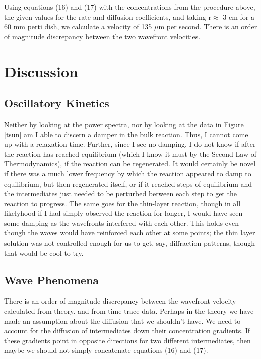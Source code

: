 \documentclass{article}
\begin{document}
Using equations (16) and (17) with the concentrations from the procedure above, the 
given values for the rate and diffusion coefficients, and taking $\mathrm{r}\approx$ 3 cm
for a 60 mm perti dish, we calculate a velocity of 135 $\mu$m per second. There is an 
order of magnitude discrepancy between the two wavefront velocities.

\section{Discussion}

\subsection{Oscillatory Kinetics}

Neither by looking at the power spectra, nor by looking at the data in Figure \ref{tsun} am
I able to discern a damper in the bulk reaction. Thus, I cannot come up with a relaxation 
time. Further, since I see no damping, I do not know if after the reaction has reached 
equilibrium (which I know it must by the Second Law of Thermodynamics), if the reaction can 
be  regenerated. It would certainly be novel if there was a much lower frequency by which the
reaction appeared to damp to equilibrium, but then regenerated itself, or if it reached
steps of equilibrium and  the intermediates just needed to be perturbed between each step
to get the reaction to progress. The same goes for the thin-layer reaction, though in all 
likelyhood if I had simply observed the reaction for longer, I would have seen some damping
as the wavefronts interfered with each other. This holds even though the waves would have 
reinforced each other at some points; the thin layer solution was not controlled enough for 
us to get, say, diffraction patterns, though that would be cool to try.



\subsection{Wave Phenomena}

There is an  order of magnitude discrepancy between the wavefront velocity calculated from 
theory. and from time trace data. Perhaps in the theory we have made an assumption about
the diffusion that we shouldn't have. We need to account for the diffusion of intermediates
down their concentration gradients. If these gradients point in opposite directions for two
different intermediates, then maybe we should not simply concatenate equations (16) and 
(17).
\end{document}
